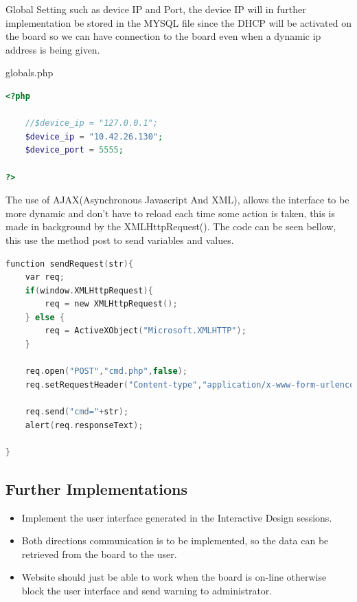 Global Setting such as device IP and Port, the device IP will in further implementation be stored in the MYSQL file since the DHCP will be activated on the board so we can have connection to the board even when a dynamic ip address is being given.

globals.php

\begin{lstlisting}[language=php]
<?php
	
	//$device_ip = "127.0.0.1";
	$device_ip = "10.42.26.130";
	$device_port = 5555;
	
?>
\end{lstlisting}

The use of AJAX(Asynchronous Javascript And XML), allows the interface to be more dynamic and don't have to reload each time some action is taken, this is made in background by the XMLHttpRequest(). The code can be seen bellow, this use the method post to send variables and values.

\begin{lstlisting}[language=c]
function sendRequest(str){
	var req;
	if(window.XMLHttpRequest){
		req	= new XMLHttpRequest();
	} else {
		req = ActiveXObject("Microsoft.XMLHTTP");	
	}

	req.open("POST","cmd.php",false);
	req.setRequestHeader("Content-type","application/x-www-form-urlencoded");
	
	req.send("cmd="+str);
	alert(req.responseText);

}
\end{lstlisting}

\subsection{Further Implementations}
\begin{itemize}
	\item Implement the user interface generated in the Interactive Design sessions.
	\item Both directions communication is to be implemented, so the data can be retrieved from the board to the user.
	\item Website should just be able to work when the board is on-line otherwise block the user interface and send warning to administrator.
\end{itemize}

